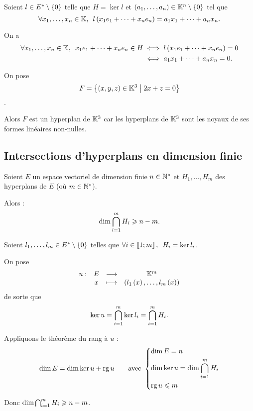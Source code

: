 \begin{dem}
Soient \(l\in E^{*}\setminus\left\lbrace0\right\rbrace\) telle que \(H=\ker l\) et \(\left(a_1,\dots,a_n\right)\in\mathbb{K}^n\setminus\left\lbrace0\right\rbrace\) tel que \[\quantifs{\forall x_1,\dots,x_n\in\K}l\paren{x_1e_1+\dots+x_ne_n}=a_1x_1+\dots+a_nx_n.\]

On a \[\begin{aligned}
\quantifs{\forall x_1,\dots,x_n\in\K}x_1e_1+\dots+x_ne_n\in H&\ssi l\paren{x_1e_1+\dots+x_ne_n}=0 \\
&\ssi a_1x_1+\dots+a_nx_n=0.
\end{aligned}\]
\end{dem}

\begin{ex}
On pose \[F=\left\lbrace\left(x,y,z\right)\in\mathbb{K}^3\;\middle|\;2x+z=0\right\rbrace\].

Alors \(F\) est un hyperplan de \(\mathbb{K}^3\) car les hyperplans de \(\mathbb{K}^3\) sont les noyaux de ses formes linéaires non-nulles.
\end{ex}

\subsection{Intersections d'hyperplans en dimension finie}

\begin{prop}
Soient \(E\) un espace vectoriel de dimension finie \(n\in\mathbb{N}^*\) et \(H_1,\dots,H_m\) des hyperplans de \(E\) (où \(m\in\mathbb{N}^*\)).

Alors : \[\dim\bigcap_{i=1}^mH_i\geqslant n-m.\]
\end{prop}

\begin{dem}
Soient \(l_1,\dots,l_m\in E^{*}\setminus\left\lbrace0\right\rbrace\) telles que \(\quantifs{\forall i\in\interventierii{1}{m}}H_i=\ker l_i\).

On pose \[\begin{array}[t]{cccc}u : & E & \longrightarrow & \mathbb{K}^m \\ & x & \longmapsto & \left(l_1\left(x\right),\dots,l_m\left(x\right)\right)\end{array}\] de sorte que \[\ker u=\bigcap_{i=1}^m\ker l_i=\bigcap_{i=1}^mH_i.\]

Appliquons le théorème du rang à \(u\) : \[\dim E=\dim\ker u+\operatorname{rg} u\qquad\text{avec }\begin{dcases}
\dim E=n \\
\dim\ker u=\dim\bigcap_{i=1}^mH_i \\
\operatorname{rg} u\leqslant m
\end{dcases}\]

Donc \(\dim\bigcap_{i=1}^mH_i\geqslant n-m\).
\end{dem}

